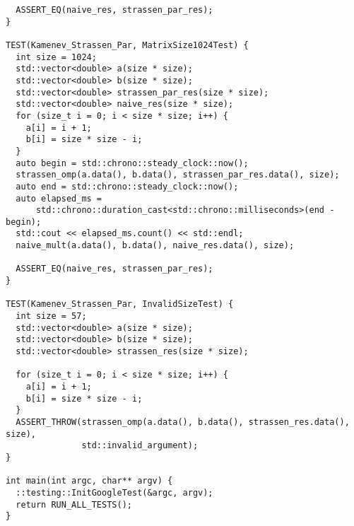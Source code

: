 \documentclass{report}
\begin{document}
\begin{lstlisting}
  ASSERT_EQ(naive_res, strassen_par_res);
}

TEST(Kamenev_Strassen_Par, MatrixSize1024Test) {
  int size = 1024;
  std::vector<double> a(size * size);
  std::vector<double> b(size * size);
  std::vector<double> strassen_par_res(size * size);
  std::vector<double> naive_res(size * size);
  for (size_t i = 0; i < size * size; i++) {
    a[i] = i + 1;
    b[i] = size * size - i;
  }
  auto begin = std::chrono::steady_clock::now();
  strassen_omp(a.data(), b.data(), strassen_par_res.data(), size);
  auto end = std::chrono::steady_clock::now();
  auto elapsed_ms =
      std::chrono::duration_cast<std::chrono::milliseconds>(end - begin);
  std::cout << elapsed_ms.count() << std::endl;
  naive_mult(a.data(), b.data(), naive_res.data(), size);

  ASSERT_EQ(naive_res, strassen_par_res);
}

TEST(Kamenev_Strassen_Par, InvalidSizeTest) {
  int size = 57;
  std::vector<double> a(size * size);
  std::vector<double> b(size * size);
  std::vector<double> strassen_res(size * size);

  for (size_t i = 0; i < size * size; i++) {
    a[i] = i + 1;
    b[i] = size * size - i;
  }
  ASSERT_THROW(strassen_omp(a.data(), b.data(), strassen_res.data(), size),
               std::invalid_argument);
}

int main(int argc, char** argv) {
  ::testing::InitGoogleTest(&argc, argv);
  return RUN_ALL_TESTS();
}


\end{lstlisting}
\end{document}
